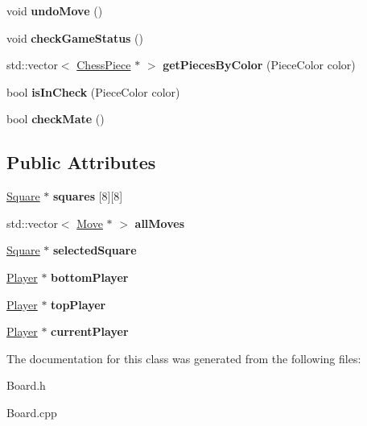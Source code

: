 \begin{DoxyCompactItemize}
void {\bfseries undo\+Move} ()
\item 
\mbox{\label{class_board_a4c93238f3c9d66b420da8e8ab4827dec}} 
void {\bfseries check\+Game\+Status} ()
\item 
\mbox{\label{class_board_ac9209dfee06d62e24e84f72ae97b2fe2}} 
std\+::vector$<$ \mbox{\hyperlink{class_chess_piece}{Chess\+Piece}} $\ast$ $>$ {\bfseries get\+Pieces\+By\+Color} (Piece\+Color color)
\item 
\mbox{\label{class_board_a858ccf256bfd728f0dca7397c4a5c5f5}} 
bool {\bfseries is\+In\+Check} (Piece\+Color color)
\item 
\mbox{\label{class_board_ad30b52d82ee21488c1f43f3ee13978c1}} 
bool {\bfseries check\+Mate} ()
\end{DoxyCompactItemize}
\subsection*{Public Attributes}
\begin{DoxyCompactItemize}
\item 
\mbox{\label{class_board_a99ddd88853d01027c7e903b97391ce02}} 
\mbox{\hyperlink{class_square}{Square}} $\ast$ {\bfseries squares} \mbox{[}8\mbox{]}\mbox{[}8\mbox{]}
\item 
\mbox{\label{class_board_a0b713008789cb6fb39e1d9b848997aa9}} 
std\+::vector$<$ \mbox{\hyperlink{class_move}{Move}} $\ast$ $>$ {\bfseries all\+Moves}
\item 
\mbox{\label{class_board_a4db7733c8dab61d734c5f0e29a46e72f}} 
\mbox{\hyperlink{class_square}{Square}} $\ast$ {\bfseries selected\+Square}
\item 
\mbox{\label{class_board_ad5e605d5c3319a4c0758fb27ec94d81f}} 
\mbox{\hyperlink{class_player}{Player}} $\ast$ {\bfseries bottom\+Player}
\item 
\mbox{\label{class_board_ad64f2c022585c3f83f5963983f745446}} 
\mbox{\hyperlink{class_player}{Player}} $\ast$ {\bfseries top\+Player}
\item 
\mbox{\label{class_board_a07865ff5631b2a9a236234acc57e9b5d}} 
\mbox{\hyperlink{class_player}{Player}} $\ast$ {\bfseries current\+Player}
\end{DoxyCompactItemize}


The documentation for this class was generated from the following files\+:\begin{DoxyCompactItemize}
\item 
Board.\+h\item 
Board.\+cpp\end{DoxyCompactItemize}
